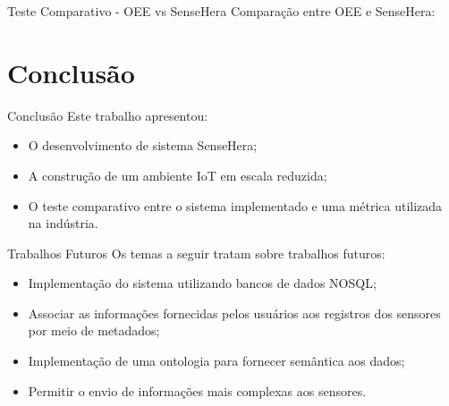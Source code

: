 \documentclass{beamer}
\begin{document}
    \begin{frame}{Teste Comparativo - OEE vs SenseHera}
      Comparação entre OEE e SenseHera:
      \begin{center}
      \end{center}
    \end{frame}
  \section{Conclusão}
    \begin{frame}{ Conclusão }
      Este trabalho apresentou:
      \begin{itemize}
        \item O desenvolvimento de sistema SenseHera;
        \item A construção de um ambiente IoT em escala reduzida;
        \item O teste comparativo entre o sistema implementado e uma métrica utilizada na indústria.
      \end{itemize}
    \end{frame}

    \begin{frame}{Trabalhos Futuros}
      Os temas a seguir tratam sobre trabalhos futuros:
      \begin{itemize}
        \item Implementação do sistema utilizando bancos de dados NOSQL;
        \item Associar as informações fornecidas pelos usuários aos registros dos sensores por meio de metadados;
        \item Implementação de uma ontologia para fornecer semântica aos dados;
        \item Permitir o envio de informações mais complexas aos sensores.
      \end{itemize}

    \end{frame}
\end{document}
